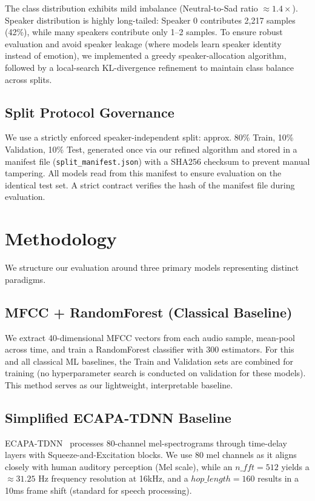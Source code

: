 \documentclass[12pt,a4paper]{report}
\begin{document}
The class distribution exhibits mild imbalance (Neutral-to-Sad ratio $\approx 1.4\times$). Speaker distribution is highly long-tailed: Speaker 0 contributes 2,217 samples (42\%), while many speakers contribute only 1--2 samples. To ensure robust evaluation and avoid speaker leakage (where models learn speaker identity instead of emotion), we implemented a greedy speaker-allocation algorithm, followed by a local-search KL-divergence refinement to maintain class balance across splits.

\section{Split Protocol Governance}
\label{sec:split_protocol}
We use a strictly enforced speaker-independent split: approx. 80\% Train, 10\% Validation, 10\% Test, generated once via our refined algorithm and stored in a manifest file (\texttt{split\_manifest.json}) with a SHA256 checksum to prevent manual tampering. All models read from this manifest to ensure evaluation on the identical test set. A strict contract verifies the hash of the manifest file during evaluation.

\chapter{Methodology}

We structure our evaluation around three primary models representing distinct paradigms.

\section{MFCC + RandomForest (Classical Baseline)}
We extract 40-dimensional MFCC vectors from each audio sample, mean-pool across time, and train a RandomForest classifier with 300 estimators. For this and all classical ML baselines, the Train and Validation sets are combined for training (no hyperparameter search is conducted on validation for these models). This method serves as our lightweight, interpretable baseline.

\section{Simplified ECAPA-TDNN Baseline}
ECAPA-TDNN~\cite{ecapa} processes 80-channel mel-spectrograms through time-delay layers with Squeeze-and-Excitation blocks. We use 80 mel channels as it aligns closely with human auditory perception (Mel scale), while an $n\_fft=512$ yields a $\approx 31.25$ Hz frequency resolution at 16kHz, and a $hop\_length=160$ results in a 10ms frame shift (standard for speech processing).
\end{document}
